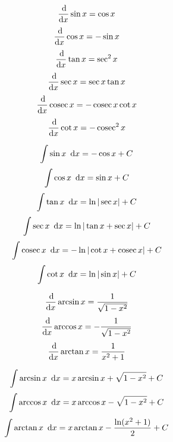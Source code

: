 \documentclass[../main.tex]{subfile}
\begin{document}

\vspace{10ex}

\begin{figure}[h]
\centering
\large
\begin{minipage}{0.49\linewidth}
	$$\frac{\operatorname{d}\!}{\operatorname{d}\! x}\sin x = \cos x$$
	\vspace{0.5em}
	$$\frac{\operatorname{d}\!}{\operatorname{d}\! x}\cos x = -\sin x$$
	\vspace{0.5em}
	$$\frac{\operatorname{d}\!}{\operatorname{d}\! x}\tan x = \sec^2 x$$
	\vspace{0.5em}
	$$\frac{\operatorname{d}\!}{\operatorname{d}\! x}\sec x = \sec x\tan x$$
	\vspace{0.5em}
	$$\frac{\operatorname{d}\!}{\operatorname{d}\! x}\mathop{\rm cosec}\nolimits x = -\mathop{\rm cosec}\nolimits x\cot x$$
	\vspace{0.5em}
	$$\frac{\operatorname{d}\!}{\operatorname{d}\! x}\cot x = -\mathop{\rm cosec}\nolimits^2 x$$
\end{minipage}\hfill
\begin{minipage}{0.49\linewidth}
	$$\int \sin x \ \operatorname{d}\! x = -\cos x + C$$
	\vspace{0.5em}
	$$\int \cos x \ \operatorname{d}\! x = \sin x + C$$
	\vspace{0.5em}
	$$\int \tan x \ \operatorname{d}\! x = \ln|\sec x| + C$$
	\vspace{0.5em}
	$$\int \sec x \ \operatorname{d}\! x = \ln|\tan x + \sec x| + C$$
	\vspace{0.5em}
	$$\int \mathop{\rm cosec}\nolimits x \ \operatorname{d}\! x = -\ln|\cot x + \mathop{\rm cosec}\nolimits x| + C$$
	\vspace{0.5em}
	$$\int \cot x \ \operatorname{d}\! x = \ln|\sin x| + C$$
\end{minipage}
\end{figure}

\begin{figure}[h]
\centering
\large
\begin{minipage}{0.49\linewidth}
	$$\frac{\operatorname{d}\!}{\operatorname{d}\! x}\arcsin x = \frac{1}{\sqrt{1 - x^2}}$$
	\vspace{0.5em}
	$$\frac{\operatorname{d}\!}{\operatorname{d}\! x}\arccos x = -\frac{1}{\sqrt{1 - x^2}}$$
	\vspace{0.5em}
	$$\frac{\operatorname{d}\!}{\operatorname{d}\! x}\arctan x = \frac{1}{x^2 + 1}$$
\end{minipage}\hfill
\begin{minipage}{0.49\linewidth}
	$$\int \arcsin x \ \operatorname{d}\! x = x \arcsin x + \sqrt{1 - x^2} + C$$
	\vspace{0.5em}
	$$\int \arccos x \ \operatorname{d}\! x = x \arccos x - \sqrt{1 - x^2} + C$$
	\vspace{0.5em}
	$$\int \arctan x \ \operatorname{d}\! x = x \arctan x - \frac{\ln(x^2 + 1)}{2} + C$$
\end{minipage}
\end{figure}
\end{document}
